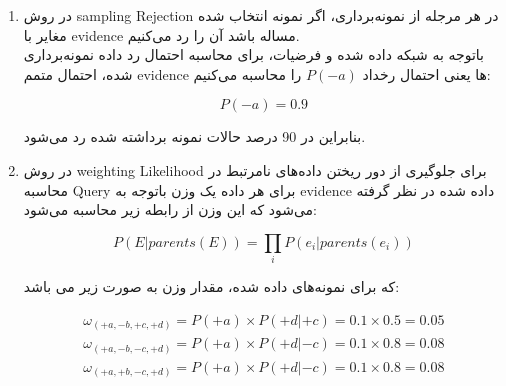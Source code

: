 \begin{enumerate} [label=(\alph*)]
	\item
	در روش sampling Rejection در هر مرجله از نمونه‌برداری، اگر نمونه انتخاب شده مغایر با evidence مساله باشد آن را رد می‌کنیم.\\
	باتوجه به شبکه داده شده و فرضیات، برای محاسبه احتمال رد داده نمونه‌برداری شده، احتمال متمم evidence ها یعنی احتمال رخداد $P\left( { - a} \right)$ را محاسبه می‌کنیم:
	
	$$
	P\left( { - a} \right) = 0.9
	$$
	
	بنابراین در 90 درصد حالات نمونه برداشته شده رد می‌شود.
	
	\item
	در روش weighting Likelihood برای جلوگیری از دور ریختن داده‌های نامرتبط در محاسبه Query برای هر داده یک وزن باتوجه به evidence داده شده در نظر گرفته می‌شود که این وزن از رابطه زیر محاسبه می‌شود:
	
	$$
	P(E|parents(E)) = \prod\limits_i {P({e_i}|parents({e_i}))} 
	$$
	
	که برای نمونه‌های داده شده، مقدار وزن به صورت زیر می باشد:
	
	$$
	\begin{array}{l}
		{\omega _{( + a, - b, + c, + d)}} = P( + a) \times P( + d| + c) = 0.1 \times 0.5 = 0.05\\
		{\omega _{( + a, - b, - c, + d)}} = P( + a) \times P( + d| - c) = 0.1 \times 0.8 = 0.08\\
		{\omega _{( + a, + b, - c, + d)}} = P( + a) \times P( + d| - c) = 0.1 \times 0.8 = 0.08
	\end{array}
	$$
\end{enumerate}